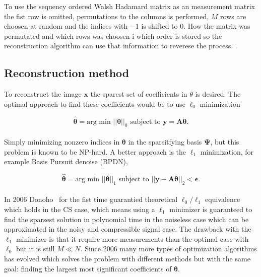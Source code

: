 To use the sequency ordered Walsh Hadamard matrix as an measurement matrix the fist row is omitted, permutations to the columns is performed, $M$ rows are choosen at random and the indices with $-1$ is shifted to $0$. How the matrix was permutated and which rows was choosen i which order is stored so the reconstruction algorithm can use that information to reverese the process. \cite{article:SRM_long, article:TVAL3, article:an_improved_WH_matrix}. 


\subsection{Reconstruction method}
To reconstruct the image $\textbf{x}$ the sparest set of coefficients in $\theta$ is desired. The optimal approach to find these coefficients would be to use $\ell_0$ minimization


\begin{equation}
   \mathbf{ \hat{\theta}} = \text{arg min } ||\mathbf{\theta}||_0 \text{  subject to  } \mathbf{y = A\theta} \text{.}
\end{equation}\\[0.1in]


Simply minimizing nonzero indices in $\mathbf{\theta}$ in the sparsitfying basis $\mathbf{\Psi}$, but this problem is known to be NP-hard. A better approach is the $\ell_1$ minimization, for example Basis Pursuit denoise (BPDN),

\begin{equation}
    \mathbf{\hat{\theta}} = \text{arg min } ||\mathbf{\theta}||_1 \text{  subject to  } ||\mathbf{y - A\theta}||_2 < \mathbf{\epsilon} \text{.}
\end{equation}\\[0.1in]


In 2006 Donoho~\cite{article:CS_donoho1} for the fist time guarantied theoretical $\ell_0\text{/}\ell_1$ equivalence which holds in the CS case, which means using a $\ell_1$ minimizer is guaranteed to find the sparsest solution in polynomial time in the noiseless case which can be approximated in the noisy and compressible signal case. The drawback with the $\ell_1$ minimizer is that it require more measurements than the optimal case with $\ell_0$ but it is still $M \ll N$. Since 2006 many more types of optimization algorithms has evolved which solves the problem with different methods but with the same goal: finding the largest most significant coefficients of $\mathbf{\theta}$. \cite{article:CS_donoho1, article:single_pixel_im_cs, article:a_new_ci_arc}



